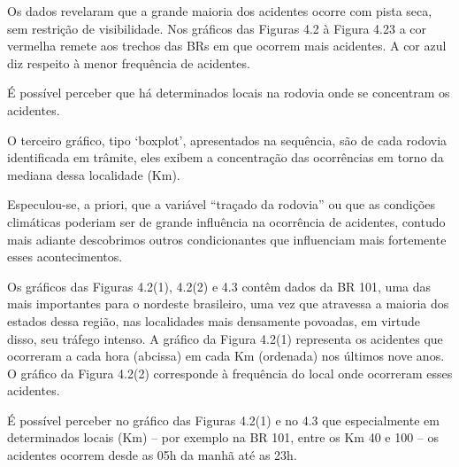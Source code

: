 Os dados revelaram que a grande maioria dos acidentes ocorre com pista seca, sem restrição de visibilidade. Nos gráficos das Figuras 4.2 à Figura 4.23 a cor vermelha remete aos trechos das BRs em que ocorrem mais acidentes. A cor azul diz respeito à menor frequência de acidentes.

É possível perceber que há determinados locais na rodovia onde se concentram os acidentes. 

O terceiro gráfico, tipo ‘boxplot’, apresentados na sequência, são de cada rodovia identificada em trâmite, eles exibem a concentração das ocorrências em torno da mediana dessa localidade (Km).
 
Especulou-se, a priori, que a variável “traçado da rodovia” ou que as condições climáticas poderiam ser de grande influência na ocorrência de acidentes, contudo mais adiante descobrimos outros condicionantes que influenciam mais fortemente esses acontecimentos. 

\pagebreak

Os gráficos das Figuras 4.2(1), 4.2(2)  e 4.3 contêm dados da BR 101, uma das mais importantes para o nordeste brasileiro, uma vez que atravessa a maioria dos estados dessa região, nas localidades mais densamente povoadas, em virtude disso, seu tráfego intenso. 
A gráfico da Figura 4.2(1) representa os acidentes que ocorreram a cada hora (abcissa) em cada Km (ordenada) nos últimos nove anos. 
O  gráfico da Figura 4.2(2) corresponde à frequência do local onde ocorreram esses acidentes. 

É possível perceber no gráfico das Figuras 4.2(1) e no 4.3 que especialmente em determinados locais (Km) -- por exemplo na BR 101, entre os Km 40 e 100 -- os acidentes ocorrem desde as 05h da manhã até as 23h. 

